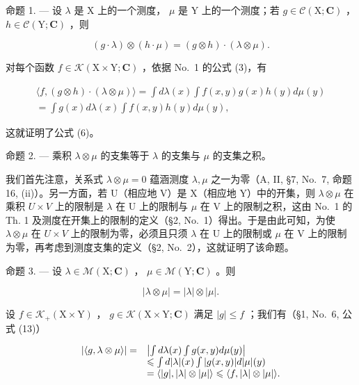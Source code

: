 命题 1. --- 设 \(\lambda\) 是 X 上的一个测度， \(\mu\) 是 Y 上的一个测度；若 \(g \in \mathcal{C}(\mathrm{X};\mathbf{C})\) ， \(h \in \mathcal{C}(\mathrm{Y};\mathbf{C})\) ，则

\[
(g \cdot \lambda) \otimes (h \cdot \mu) = (g \otimes h) \cdot (\lambda \otimes \mu).\tag{6}
\]

对每个函数 \(f \in \mathcal{K}(\mathrm{X} \times \mathrm{Y}; \mathbf{C})\) ，依据 No.~1 的公式 (3)，有

\[
\begin{array}{c} \langle f, (g \otimes h) \cdot (\lambda \otimes \mu) \rangle = \int d \lambda (x) \int f (x, y) g (x) h (y) d \mu (y) \\ = \int g (x) d \lambda (x) \int f (x, y) h (y) d \mu (y), \end{array}
\]

这就证明了公式 (6)。

命题 2. --- 乘积 \(\lambda \otimes \mu\) 的支集等于 \(\lambda\) 的支集与 \(\mu\) 的支集之积。

我们首先注意，关系式 \(\lambda \otimes \mu = 0\) 蕴涵测度 \(\lambda, \mu\) 之一为零（A, II, §7, No.~7, 命题 16, (ii)）。另一方面，若 U（相应地 V）是 X（相应地 Y）中的开集，则 \(\lambda\otimes\mu\) 在乘积 \(U\times V\) 上的限制是 \(\lambda\) 在 U 上的限制与 \(\mu\) 在 V 上的限制之积，这由 No.~1 的 Th. 1 及测度在开集上的限制的定义（§2, No.~1）得出。于是由此可知，为使 \(\lambda\otimes\mu\) 在 \(U\times V\) 上的限制为零，必须且只须 \(\lambda\) 在 U 上的限制或 \(\mu\) 在 V 上的限制为零，再考虑到测度支集的定义（§2, No.~2），这就证明了该命题。

命题 3. --- 设 \(\lambda \in \mathcal{M}(\mathrm{X};\mathbf{C})\) ， \(\mu \in \mathcal{M}(\mathrm{Y};\mathbf{C})\) 。则

\[
| \lambda \otimes \mu | = | \lambda | \otimes | \mu |.\tag{7}
\]

设 \(f \in \mathcal{K}_{+}(\mathrm{X} \times \mathrm{Y})\) ， \(g \in \mathcal{K}(\mathrm{X} \times \mathrm{Y}; \mathbf{C})\) 满足 \(|g| \leqslant f\) ；我们有（§1, No.~6, 公式 (13)）

\[
\begin{array}{r l} | \langle g, \lambda \otimes \mu \rangle | = & \left| \int d \lambda (x) \int g (x, y)   d \mu (y) \right| \\ & \leqslant \int d | \lambda | (x) \int | g (x, y) |   d | \mu | (y) \\ & = \langle | g |, | \lambda | \otimes | \mu | \rangle \leqslant \langle f, | \lambda | \otimes | \mu | \rangle . \end{array}
\]

